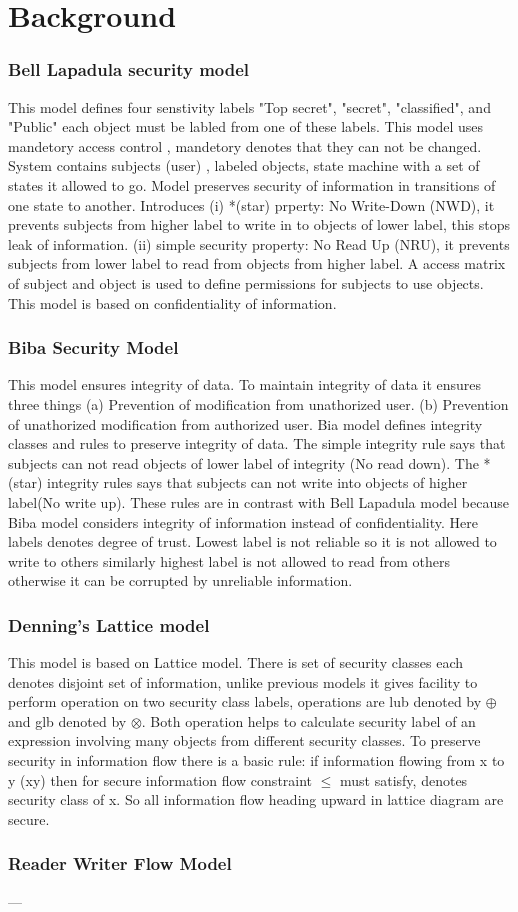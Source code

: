 \chapter{Background}
\label{ch:bg}       
\subsection{Bell Lapadula security model \cite{lapadula}}
This model defines four senstivity labels "Top secret", "secret", "classified", and "Public" each object must be labled from one of these labels. This model uses mandetory access control , mandetory denotes that they can not be changed. System contains subjects (user) , labeled objects, state machine with a set of states it allowed to go. Model preserves security of information in transitions of one state to another. Introduces (i) *(star) prperty: No Write-Down (NWD), it prevents subjects from higher label to write in to objects of lower label, this stops leak of information. (ii) simple security property: No Read Up (NRU), it prevents subjects from lower label to read from objects from higher label. A access matrix of subject and object is used to define permissions for subjects to use objects. This model is based on confidentiality of information.
\subsection{Biba Security Model \cite{biba}}  
This model ensures integrity of data. To maintain integrity of data it ensures three things (a) Prevention of modification from unathorized user. (b) Prevention of unathorized modification from authorized user. Bia model defines integrity classes and rules to preserve integrity of data. The simple integrity rule says that subjects can not read objects of lower label of integrity (No read down). The *(star) integrity rules says that subjects can not write into objects of higher label(No write up). These rules are in contrast with Bell Lapadula model because Biba model considers integrity of information instead of confidentiality. Here labels denotes degree of trust. Lowest label is not reliable so it is not allowed to write to others similarly highest label is not allowed to read from others otherwise it can be corrupted by unreliable information.
\subsection{Denning's Lattice model \cite{denning}}
This model is based on Lattice model. There is set of security classes each denotes disjoint set of information, unlike previous models it gives facility to perform operation on two security class labels, operations are lub denoted by $\oplus$ and glb denoted by $\otimes$. Both operation helps to calculate security label of an expression involving many objects from different security classes. To preserve security in information flow there is a basic rule: if information flowing from x to y (x\marr y) then for secure information flow constraint $\le$ must satisfy,  denotes security class of x. So all information flow heading upward in lattice diagram are secure.  
\subsection{Reader Writer Flow Model \cite{rwfm}} 
---


